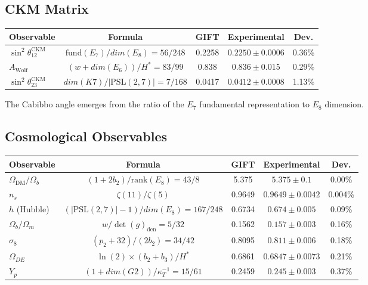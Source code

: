 \documentclass[11pt,a4paper]{article}
\newcommand{\E}{\mathrm{E}}
\newcommand{\Gtwo}{\mathrm{G}_2}
\newcommand{\Kseven}{K_7}
\newcommand{\dimE}{\mathrm{dim}}
\newcommand{\Weyl}{w}
\newcommand{\DE}{\mathrm{DE}}
\newcommand{\rank}{\mathrm{rank}}
\def\Gtwo{G2}%
\def\Kseven{K7}%
\def\E{E}%
\def\dimE{dim}%
\def\Weyl{w}%
\def\DE{DE}%
\begin{document}
\subsection{CKM Matrix}

\begin{table}[H]
\centering
\small
\begin{tabular}{lcccc}
\toprule
Observable & Formula & GIFT & Experimental & Dev. \\
\midrule
$\sin^2\theta_{12}^{\mathrm{CKM}}$ & $\mathrm{fund}(\E_7)/\dimE(\E_8) = 56/248$ & 0.2258 & $0.2250 \pm 0.0006$ & 0.36\% \\
$A_{\mathrm{Wolf}}$ & $(\Weyl + \dimE(\E_6))/H^* = 83/99$ & 0.838 & $0.836 \pm 0.015$ & 0.29\% \\
$\sin^2\theta_{23}^{\mathrm{CKM}}$ & $\dimE(\Kseven)/|\mathrm{PSL}(2,7)| = 7/168$ & 0.0417 & $0.0412 \pm 0.0008$ & 1.13\% \\
\bottomrule
\end{tabular}
\end{table}

The Cabibbo angle emerges from the ratio of the $\E_7$ fundamental representation to $\E_8$ dimension.

\subsection{Cosmological Observables}

\begin{table}[H]
\centering
\small
\begin{tabular}{lcccc}
\toprule
Observable & Formula & GIFT & Experimental & Dev. \\
\midrule
$\Omega_{\mathrm{DM}}/\Omega_b$ & $(1 + 2b_2)/\rank(\E_8) = 43/8$ & 5.375 & $5.375 \pm 0.1$ & 0.00\% \\
$n_s$ & $\zeta(11)/\zeta(5)$ & 0.9649 & $0.9649 \pm 0.0042$ & 0.004\% \\
$h$ (Hubble) & $(|\mathrm{PSL}(2,7)| - 1)/\dimE(\E_8) = 167/248$ & 0.6734 & $0.674 \pm 0.005$ & 0.09\% \\
$\Omega_b/\Omega_m$ & $\Weyl/\det(g)_{\mathrm{den}} = 5/32$ & 0.1562 & $0.157 \pm 0.003$ & 0.16\% \\
$\sigma_8$ & $(p_2 + 32)/(2b_2) = 34/42$ & 0.8095 & $0.811 \pm 0.006$ & 0.18\% \\
$\Omega_{\DE}$ & $\ln(2) \times (b_2 + b_3)/H^*$ & 0.6861 & $0.6847 \pm 0.0073$ & 0.21\% \\
$Y_p$ & $(1 + \dimE(\Gtwo))/\kappa_T^{-1} = 15/61$ & 0.2459 & $0.245 \pm 0.003$ & 0.37\% \\
\bottomrule
\end{tabular}
\end{table}
\end{document}
